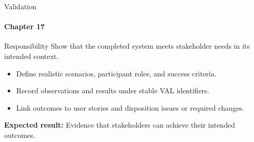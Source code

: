 \begin{frame}{Validation}
\framesubtitle{Chapter 17}
\begin{block}{Responsibility}
Show that the completed system meets stakeholder needs in its intended context.
\end{block}
\begin{itemize}
  \item Define realistic scenarios, participant roles, and success criteria.
  \item Record observations and results under stable VAL identifiers.
  \item Link outcomes to user stories and disposition issues or required changes.
\end{itemize}
\vspace{0.15cm}
\textbf{Expected result:} Evidence that stakeholders can achieve their intended outcomes.
\end{frame}
